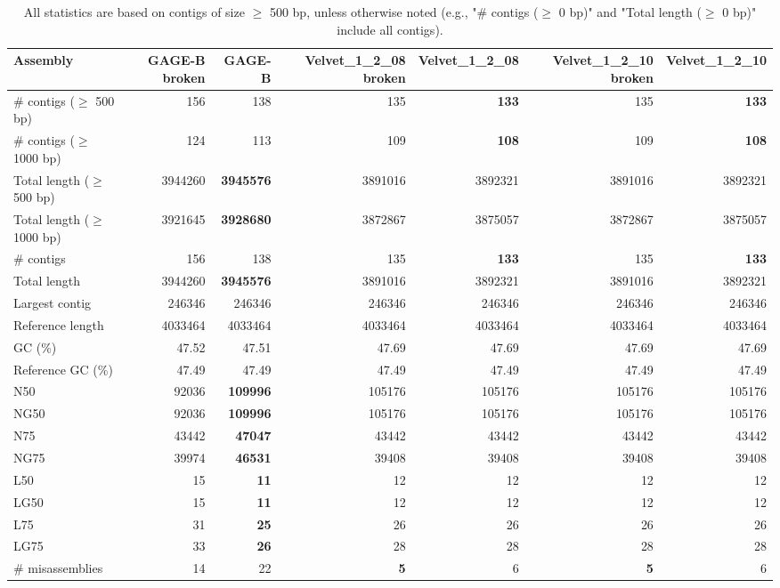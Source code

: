 \documentclass[12pt,a4paper]{article}
\begin{document}
\begin{table}[ht]
\begin{center}
\caption{All statistics are based on contigs of size $\geq$ 500 bp, unless otherwise noted (e.g., "\# contigs ($\geq$ 0 bp)" and "Total length ($\geq$ 0 bp)" include all contigs).}
\begin{tabular}{|l*{6}{|r}|}
\hline
Assembly & GAGE-B broken & GAGE-B & Velvet\_1\_2\_08 broken & Velvet\_1\_2\_08 & Velvet\_1\_2\_10 broken & Velvet\_1\_2\_10 \\ \hline
\# contigs ($\geq$ 500 bp) & 156 & 138 & 135 & {\bf 133} & 135 & {\bf 133} \\ \hline
\# contigs ($\geq$ 1000 bp) & 124 & 113 & 109 & {\bf 108} & 109 & {\bf 108} \\ \hline
Total length ($\geq$ 500 bp) & 3944260 & {\bf 3945576} & 3891016 & 3892321 & 3891016 & 3892321 \\ \hline
Total length ($\geq$ 1000 bp) & 3921645 & {\bf 3928680} & 3872867 & 3875057 & 3872867 & 3875057 \\ \hline
\# contigs & 156 & 138 & 135 & {\bf 133} & 135 & {\bf 133} \\ \hline
Total length & 3944260 & {\bf 3945576} & 3891016 & 3892321 & 3891016 & 3892321 \\ \hline
Largest contig & 246346 & 246346 & 246346 & 246346 & 246346 & 246346 \\ \hline
Reference length & 4033464 & 4033464 & 4033464 & 4033464 & 4033464 & 4033464 \\ \hline
GC (\%) & 47.52 & 47.51 & 47.69 & 47.69 & 47.69 & 47.69 \\ \hline
Reference GC (\%) & 47.49 & 47.49 & 47.49 & 47.49 & 47.49 & 47.49 \\ \hline
N50 & 92036 & {\bf 109996} & 105176 & 105176 & 105176 & 105176 \\ \hline
NG50 & 92036 & {\bf 109996} & 105176 & 105176 & 105176 & 105176 \\ \hline
N75 & 43442 & {\bf 47047} & 43442 & 43442 & 43442 & 43442 \\ \hline
NG75 & 39974 & {\bf 46531} & 39408 & 39408 & 39408 & 39408 \\ \hline
L50 & 15 & {\bf 11} & 12 & 12 & 12 & 12 \\ \hline
LG50 & 15 & {\bf 11} & 12 & 12 & 12 & 12 \\ \hline
L75 & 31 & {\bf 25} & 26 & 26 & 26 & 26 \\ \hline
LG75 & 33 & {\bf 26} & 28 & 28 & 28 & 28 \\ \hline
\# misassemblies & 14 & 22 & {\bf 5} & 6 & {\bf 5} & 6 \\ \hline

\end{tabular}
\end{center}
\end{table}
\end{document}
